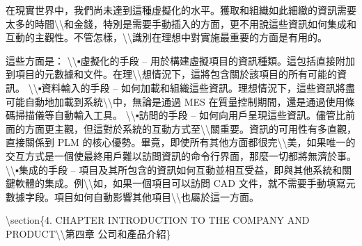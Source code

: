 在現實世界中，我們尚未達到這種虛擬化的水平。獲取和組織如此細緻的資訊需要太多的時間\textbackslash\textbackslash 和金錢，特別是需要手動插入的方面，更不用說這些資訊如何集成和互動的主觀性。不管怎樣，\textbackslash\textbackslash 識別在理想中對實施最重要的方面是有用的。

這些方面是： \textbackslash\textbackslash▪虛擬化的手段 --
用於構建虛擬項目的資訊種類。這包括直接附加到項目的元數據和文件。在理\textbackslash\textbackslash 想情況下，這將包含關於該項目的所有可能的資訊。
\textbackslash\textbackslash▪資料輸入的手段 --
如何加載和組織這些資訊。理想情況下，這些資訊將盡可能自動地加載到系統\textbackslash\textbackslash 中，無論是通過
MES 在質量控制期間，還是通過使用條碼掃描儀等自動輸入工具。
\textbackslash\textbackslash▪訪問的手段 --
如何向用戶呈現這些資訊。儘管比前面的方面更主觀，但這對於系統的互動方式至\textbackslash\textbackslash 關重要。資訊的可用性有多直觀，直接關係到
PLM
的核心優勢。畢竟，即使所有其他方面都很完\textbackslash\textbackslash 美，如果唯一的交互方式是一個使最終用戶難以訪問資訊的命令行界面，那麼一切都將無濟於事。
\textbackslash\textbackslash▪集成的手段 --
項目及其所包含的資訊如何互動並相互受益，即與其他系統和關鍵軟體的集成。例\textbackslash\textbackslash 如，如果一個項目可以訪問
CAD
文件，就不需要手動填寫元數據字段。項目如何自動影響其他項目\textbackslash\textbackslash 也屬於這一方面。

\textbackslash section\{4. CHAPTER INTRODUCTION TO THE COMPANY AND
PRODUCT\textbackslash\textbackslash 第四章 公司和產品介紹\}

